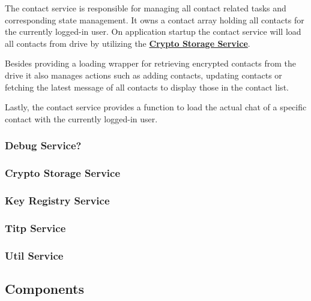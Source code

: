 The contact service is responsible for managing all contact related tasks and corresponding state management.
It owns a contact array holding all contacts for the currently logged-in user.
On application startup the contact service will load all contacts from drive by utilizing the
\textbf{\hyperref[subsubsec:crypto-storage-service]{Crypto Storage Service}}.

Besides providing a loading wrapper for retrieving encrypted contacts from the drive it also manages actions such as
adding contacts, updating contacts or fetching the latest message of all contacts to display those in the contact list.

Lastly, the contact service provides a function to load the actual chat of a specific contact with the currently
logged-in user.


\subsubsection{Debug Service?}

\subsubsection{Crypto Storage Service}

\subsubsection{Key Registry Service}

\subsubsection{Titp Service}

\subsubsection{Util Service}

\subsection{Components}

